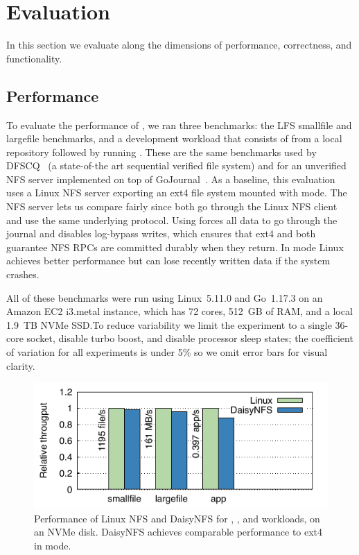 \section{Evaluation}
\label{sec:eval}

In this section we evaluate \sys along the dimensions of performance,
correctness, and functionality.

\subsection{Performance}
\label{sec:eval:bench}

To evaluate the performance of \sys, we ran three benchmarks: the LFS smallfile
and largefile benchmarks, and a development workload that consists of  from a local repository followed by running . These are the same
benchmarks used by DFSCQ~\cite{chen:dfscq} (a state-of-the art sequential
verified file system) and for an unverified NFS server implemented on top of
GoJournal~\cite{chajed:gojournal}. As a baseline, this evaluation uses a Linux
NFS server exporting an ext4 file system mounted with  mode.
The NFS server lets us compare fairly since both go through the Linux NFS client
and use the same underlying protocol. Using  forces all data to
go through the journal and disables log-bypass writes, which ensures that
ext4 and \sys both guarantee NFS RPCs are committed durably when they return. In
 mode Linux achieves better performance but can
lose recently written data if the system crashes.

All of these benchmarks were run using Linux~5.11.0 and Go~1.17.3 on an Amazon
EC2 i3.metal instance, which has 72 cores, 512~GB of RAM, and a local 1.9~TB
NVMe SSD.\@ To reduce variability we limit the experiment to a single 36-core
socket, disable turbo boost, and disable processor sleep states; the coefficient
of variation for all experiments is under 5\% so we omit error bars for visual
clarity.



\begin{figure}
  \includegraphics{daisy-nfs/fig/bench.pdf}
  \caption{Performance of Linux NFS and DaisyNFS for ,
    , and  workloads, on an NVMe disk.
    DaisyNFS achieves comparable performance to ext4 in  mode.}
  \label{fig:eval:bench}
\end{figure}

